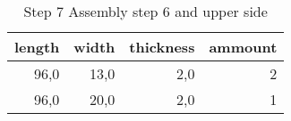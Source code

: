 \begin{table}[h!]
\centering
\caption{Step 7 Assembly step 6 and upper side}
\begin{tabular}{rrrr}
\toprule
 length &  width &  thickness &  ammount \\
\midrule
   96,0 &   13,0 &        2,0 &        2 \\
   96,0 &   20,0 &        2,0 &        1 \\
\bottomrule
\end{tabular}
\end{table}
